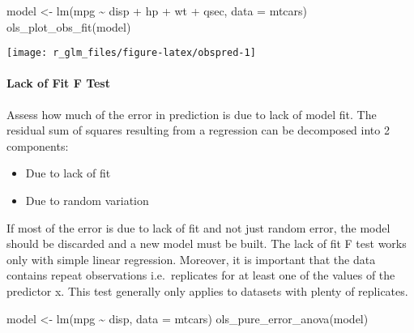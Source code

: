 \documentclass[
]{article}
\newenvironment{Shaded}{\begin{snugshade}}{\end{snugshade}}
\newcommand{\AttributeTok}[1]{\textcolor[rgb]{0.77,0.63,0.00}{#1}}
\newcommand{\FunctionTok}[1]{\textcolor[rgb]{0.00,0.00,0.00}{#1}}
\newcommand{\NormalTok}[1]{#1}
\newcommand{\OtherTok}[1]{\textcolor[rgb]{0.56,0.35,0.01}{#1}}
\newcommand{\SpecialCharTok}[1]{\textcolor[rgb]{0.00,0.00,0.00}{#1}}
\providecommand{\tightlist}{%
  \setlength{\itemsep}{0pt}\setlength{\parskip}{0pt}}
\begin{document}
\begin{Shaded}
\begin{Highlighting}[]
\NormalTok{model }\OtherTok{\textless{}{-}} \FunctionTok{lm}\NormalTok{(mpg }\SpecialCharTok{\textasciitilde{}}\NormalTok{ disp }\SpecialCharTok{+}\NormalTok{ hp }\SpecialCharTok{+}\NormalTok{ wt }\SpecialCharTok{+}\NormalTok{ qsec, }\AttributeTok{data =}\NormalTok{ mtcars)}
\FunctionTok{ols\_plot\_obs\_fit}\NormalTok{(model)}
\end{Highlighting}
\end{Shaded}

\begin{center}\texttt{[image: r\_glm\_files/figure-latex/obspred-1]} \end{center}

\hypertarget{lack-of-fit-f-test}{%
\paragraph{Lack of Fit F Test}\label{lack-of-fit-f-test}}

Assess how much of the error in prediction is due to lack of model fit.
The residual sum of squares resulting from a regression can be
decomposed into 2 components:

\begin{itemize}
\tightlist
\item
  Due to lack of fit
\item
  Due to random variation
\end{itemize}

If most of the error is due to lack of fit and not just random error,
the model should be discarded and a new model must be built. The lack of
fit F test works only with simple linear regression. Moreover, it is
important that the data contains repeat observations i.e.~replicates for
at least one of the values of the predictor x. This test generally only
applies to datasets with plenty of replicates.

\begin{Shaded}
\begin{Highlighting}[]
\NormalTok{model }\OtherTok{\textless{}{-}} \FunctionTok{lm}\NormalTok{(mpg }\SpecialCharTok{\textasciitilde{}}\NormalTok{ disp, }\AttributeTok{data =}\NormalTok{ mtcars)}
\FunctionTok{ols\_pure\_error\_anova}\NormalTok{(model)}
\end{Highlighting}
\end{Shaded}
\end{document}
